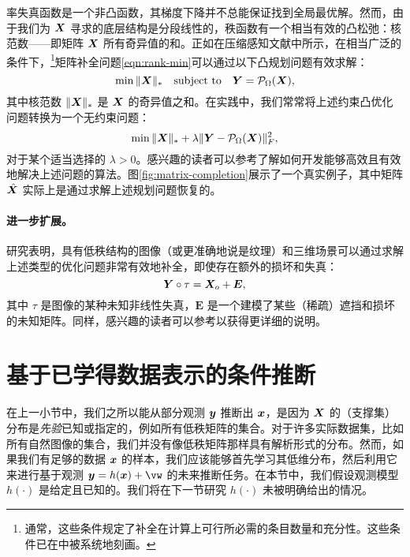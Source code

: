 \documentclass[../../book-main_zh.tex]{subfiles}
\begin{document}
率失真函数是一个非凸函数，其梯度下降并不总能保证找到全局最优解。然而，由于我们为 $\bm{X}$ 寻求的底层结构是分段线性的，秩函数有一个相当有效的凸松弛：核范数——即矩阵 $\bm{X}$ 所有奇异值的和。正如在压缩感知文献中所示，在相当广泛的条件下，\footnote{通常，这些条件规定了补全在计算上可行所必需的条目数量和充分性。这些条件已在\cite{Wright-Ma-2022}中被系统地刻画。}矩阵补全问题\eqref{eqn:rank-min}可以通过以下凸规划问题有效求解：
\begin{equation}
\min \|\bm{X}\|_* \quad \mbox{subject to}
\quad
\bm{Y} = \mathcal{P}_{\Omega}(\bm{X}),
\label{eqn:nuclear-min}
\end{equation}
其中核范数 $\|\bm{X}\|_*$ 是 $\bm{X}$ 的奇异值之和。在实践中，我们常常将上述约束凸优化问题转换为一个无约束问题：
\begin{equation}
\min \|\bm{X}\|_*  + \lambda \|
\bm{Y} - \mathcal{P}_{\Omega}(\bm{X})\|_F^2,
\label{eqn:nuclear-min-lagrangian}
\end{equation}
对于某个适当选择的 $\lambda > 0$。感兴趣的读者可以参考\cite{Wright-Ma-2022}了解如何开发能够高效且有效地解决上述问题的算法。图\ref{fig:matrix-completion}展示了一个真实例子，其中矩阵 $\hat {\bm{X}}$ 实际上是通过求解上述规划问题恢复的。

\paragraph{进一步扩展。}
研究表明，具有低秩结构的图像（或更准确地说是纹理）和三维场景可以通过求解上述类型的优化问题非常有效地补全，即使存在额外的损坏和失真\cite{Zhang2010TILTTI,Liang-ECCV2012,Yi_2023_ICCV}：
\begin{equation}
    \bm{Y} \circ \tau = \bm{X}_o + \boldsymbol{E},
\end{equation}
其中 $\tau$ 是图像的某种未知非线性失真，$\boldsymbol{E}$ 是一个建模了某些（稀疏）遮挡和损坏的未知矩阵。同样，感兴趣的读者可以参考\cite{Wright-Ma-2022}以获得更详细的说明。

\section{基于已学得数据表示的条件推断}
在上一小节中，我们之所以能从部分观测 $\bm{y}$ 推断出 $\bm{x}$，是因为 $\bm{X}$ 的（支撑集）分布是{\em 先验}已知或指定的，例如所有低秩矩阵的集合。对于许多实际数据集，比如所有自然图像的集合，我们并没有像低秩矩阵那样具有解析形式的分布。然而，如果我们有足够的数据 $\bm{x}$ 的样本，我们应该能够首先学习其低维分布，然后利用它来进行基于观测 $\y = h(\x) + \vw$ 的未来推断任务。在本节中，我们假设观测模型 $h(\cdot)$ 是给定且已知的。我们将在下一节研究 $h(\cdot)$ 未被明确给出的情况。
\end{document}
